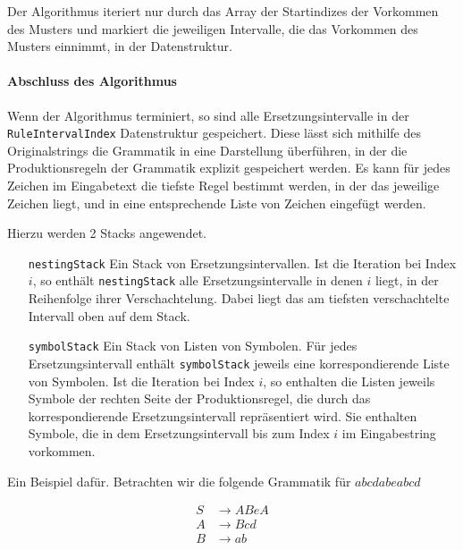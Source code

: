 Der Algorithmus iteriert nur durch das Array der Startindizes der Vorkommen des Musters und markiert die jeweiligen Intervalle, die das Vorkommen des Musters einnimmt, in der Datenstruktur. 

\paragraph{Abschluss des Algorithmus}

Wenn der Algorithmus terminiert, so sind alle Ersetzungsintervalle in der \texttt{RuleIntervalIndex} Datenstruktur gespeichert.
Diese lässt sich mithilfe des Originalstrings die Grammatik in eine Darstellung überführen, in der die Produktionsregeln der Grammatik explizit gespeichert werden.
Es kann für jedes Zeichen im Eingabetext die tiefste Regel bestimmt werden, in der das jeweilige Zeichen liegt, und in eine entsprechende Liste von Zeichen eingefügt werden.

Hierzu werden 2 Stacks angewendet.
\begin{itemize}[leftmargin=2cm]
    \item[\texttt{nestingStack}] Ein Stack von Ersetzungsintervallen. Ist die Iteration bei Index $i$, so enthält \texttt{nestingStack} alle Ersetzungsintervalle in denen $i$ liegt, in der Reihenfolge ihrer Verschachtelung. Dabei liegt das am tiefsten verschachtelte Intervall oben auf dem Stack.
    \item[\texttt{symbolStack}] Ein Stack von Listen von Symbolen. Für jedes Ersetzungsintervall enthält \texttt{symbolStack} jeweils eine korrespondierende Liste von Symbolen. 
    Ist die Iteration bei Index $i$, so enthalten die Listen jeweils Symbole der rechten Seite der Produktionsregel, die durch das korrespondierende Ersetzungsintervall repräsentiert wird. Sie enthalten Symbole, die in dem Ersetzungsintervall bis zum Index $i$ im Eingabestring vorkommen. 
\end{itemize} 

Ein Beispiel dafür. Betrachten wir die folgende Grammatik für $abcdabeabcd$

\begin{align*}
    S &\rightarrow ABeA\\
    A &\rightarrow Bcd\\
    B &\rightarrow ab\\
\end{align*}

